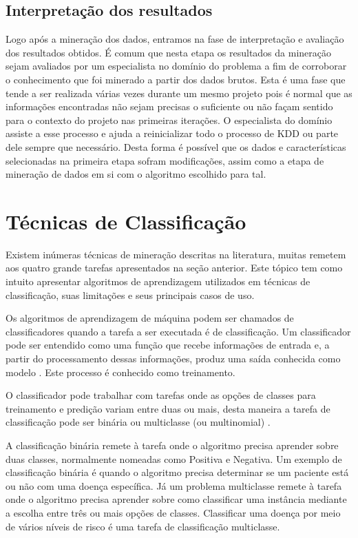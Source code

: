 \subsection{Interpretação dos resultados}

Logo após a mineração dos dados, entramos na fase de interpretação e avaliação dos resultados obtidos.  É comum que nesta etapa os resultados da mineração sejam avaliados por um especialista no domínio do problema a fim de corroborar o conhecimento que foi minerado a partir dos dados brutos. Esta é uma fase que tende a ser realizada várias vezes durante um mesmo projeto pois é normal que as informações encontradas não sejam precisas o suficiente ou não façam sentido para o contexto do projeto nas primeiras iterações. O especialista do domínio assiste a esse processo e ajuda a reinicializar todo o processo de KDD ou parte dele sempre que necessário. Desta forma é possível que os dados e características selecionadas na primeira etapa sofram modificações, assim como a etapa de mineração de dados em si com o algoritmo escolhido para tal.

\section{Técnicas de Classificação}
Existem inúmeras técnicas de mineração descritas na literatura, muitas remetem aos quatro grande tarefas apresentados na seção anterior. Este tópico tem como intuito apresentar algoritmos de aprendizagem utilizados em técnicas de classificação, suas limitações e seus principais casos de uso.

Os algoritmos de aprendizagem de máquina podem ser chamados de classificadores quando a tarefa a ser executada é de classificação. Um classificador pode ser entendido como uma função que recebe informações de entrada e, a partir do processamento dessas informações, produz uma saída conhecida como modelo \cite{Fayyad1996}. Este processo é conhecido como treinamento.

O classificador pode trabalhar com tarefas onde as opções de classes para treinamento e predição variam entre duas ou mais, desta maneira a tarefa de classificação pode ser binária ou multiclasse (ou multinomial) \cite{Aggarwal2015}.

A classificação binária remete à tarefa onde o algoritmo precisa aprender sobre duas classes, normalmente nomeadas como   Positiva e Negativa. Um exemplo de classificação binária é quando o algoritmo precisa determinar se um paciente está ou não com uma doença específica. Já um problema multiclasse remete à tarefa onde o algoritmo precisa aprender sobre como classificar uma instância mediante a escolha entre três ou mais opções de classes. Classificar uma doença por meio de vários níveis de risco é uma tarefa de classificação multiclasse.

